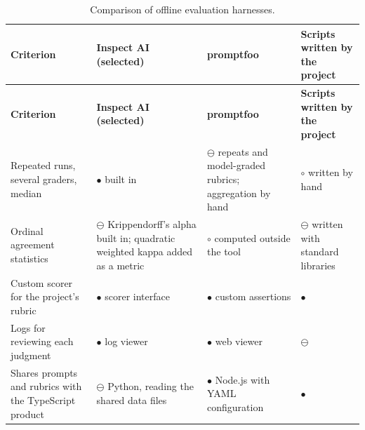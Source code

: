 {\small{}\renewcommand{\arraystretch}{1.1}
\begin{longtable}{|>{\raggedright\arraybackslash}p{}|>{\raggedright\arraybackslash}p{}|>{\raggedright\arraybackslash}p{}|>{\raggedright\arraybackslash}p{}|}
\caption{Comparison of offline evaluation harnesses.} \\
\hline
\textbf{Criterion} & \textbf{Inspect AI (selected)\cite{r129}} & \textbf{promptfoo\cite{r198}} & \textbf{Scripts written by the project} \\ \hline
\endfirsthead
\hline
\textbf{Criterion} & \textbf{Inspect AI (selected)\cite{r129}} & \textbf{promptfoo\cite{r198}} & \textbf{Scripts written by the project} \\ \hline
\endhead
Repeated runs, several graders, median & $\bullet$ built in & $\ominus$ repeats and model-\allowbreak{}graded rubrics; aggregation by hand & $\circ$ written by hand \\ \hline
Ordinal agreement statistics & $\ominus$ Krippendorff's alpha built in; quadratic weighted kappa added as a metric & $\circ$ computed outside the tool & $\ominus$ written with standard libraries \\ \hline
Custom scorer for the project's rubric & $\bullet$ scorer interface & $\bullet$ custom assertions & $\bullet$ \\ \hline
Logs for reviewing each judgment & $\bullet$ log viewer & $\bullet$ web viewer & $\ominus$ \\ \hline
Shares prompts and rubrics with the TypeScript product & $\ominus$ Python, reading the shared data files & $\bullet$ Node.js with YAML configuration & $\bullet$ \\ \hline
\end{longtable}
}

